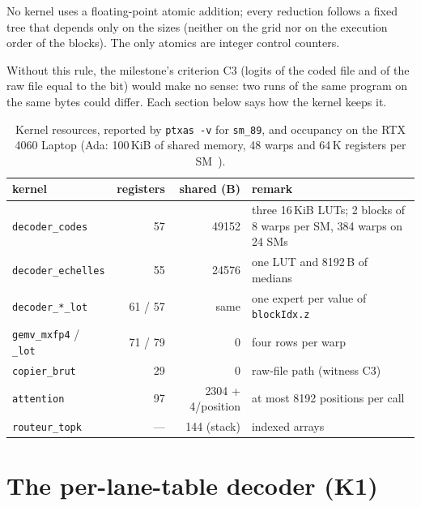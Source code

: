 \begin{definition}\label{def:t2n-determinisme}
No kernel uses a floating-point atomic addition; every reduction follows a fixed tree that depends only on the sizes (neither on the grid nor on the execution order of the blocks). The only atomics are integer control counters.
\end{definition}

Without this rule, the milestone's criterion C3 (logits of the coded file and of the raw file equal to the bit) would make no sense: two runs of the same program on the same bytes could differ. Each section below says how the kernel keeps it.

\begin{table}[!htbp]
\centering\small
\caption[Kernel resources on Ada]{Kernel resources, reported by \texttt{ptxas -v} for \texttt{sm\_89}, and occupancy on the RTX 4060 Laptop (Ada: 100\,KiB of shared memory, 48 warps and 64\,K registers per SM~\cite{nvidia2026adatuning}).}
\label{tab:t2n-ressources}
\begin{tabularx}{\linewidth}{@{}lrrX@{}}
\toprule
kernel & registers & shared (B) & remark \\
\midrule
\texttt{decoder\_codes} & 57 & \num{49152} & three 16\,KiB LUTs; 2 blocks of 8 warps per SM, 384 warps on 24 SMs \\
\texttt{decoder\_echelles} & 55 & \num{24576} & one LUT and \num{8192}\,B of medians \\
\texttt{decoder\_*\_lot} & 61 / 57 & same & one expert per value of \texttt{blockIdx.z} \\
\texttt{gemv\_mxfp4} / \texttt{\_lot} & 71 / 79 & 0 & four rows per warp \\
\texttt{copier\_brut} & 29 & 0 & raw-file path (witness C3) \\
\texttt{attention} & 97 & \num{2304} + 4/position & at most \num{8192} positions per call \\
\texttt{routeur\_topk} & — & 144 (stack) & indexed arrays \\
\bottomrule
\end{tabularx}
\end{table}

\section{The per-lane-table decoder (K1)}\label{sec:t2n-decodeur}

